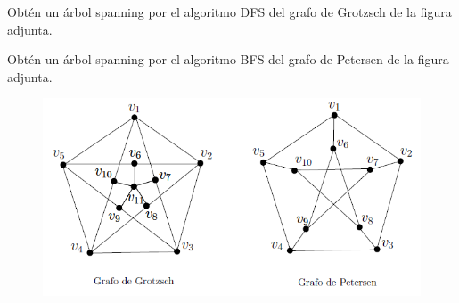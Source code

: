 \documentclass[twoside]{article}
\begin{document}
\begin{ejercicio}{1.10}
Obtén un árbol spanning por el algoritmo DFS del grafo de Grotzsch de la figura adjunta.
\end{ejercicio}
\begin{solucion}

\end{solucion}

\newpage

\begin{ejercicio}{1.11}
Obtén un árbol spanning por el algoritmo BFS del grafo de Petersen de la figura adjunta.
\end{ejercicio}
\begin{solucion}



\end{solucion}

\newpage

\begin{figure}[h!]
\includegraphics[scale=0.8]{Rel1}
\end{figure}
%
%
%
%
\end{document}
